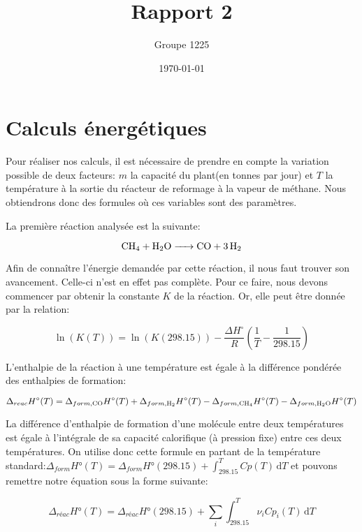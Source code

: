 \documentclass[a4paper, oneside, 12pt]{article}
\title{Rapport 2}
\author{Groupe 1225}
\date{\today}
\begin{document}
\maketitle

\section{Calculs énergétiques}

Pour réaliser nos calculs, il est nécessaire de prendre 
en compte la variation possible de 
deux facteurs: $m$ la capacité du plant(en tonnes par jour) 
et $T$ la température à la sortie du
réacteur de reformage à la vapeur de méthane.
Nous obtiendrons donc des formules où ces variables sont des paramètres.

La première réaction analysée est la suivante:

\begin{equation*}
	\ce{CH4 + H2O -> CO + 3H2}
\end{equation*}

Afin de connaître l'énergie demandée par cette réaction,
il nous faut trouver son avancement. Celle-ci n'est en effet pas complète.
Pour ce faire, nous devons commencer par obtenir la constante $K$ 
de la réaction. Or, elle peut être donnée par la relation:

\begin{equation}
	\ln{(K(T))} = \ln{(K(298.15))} - 
	\frac{\Delta H^{\circ}}{R}(\frac{1}{T} - \frac{1}{298.15})
\end{equation}

L'enthalpie de la réaction à une température est égale 
à la différence pondérée des enthalpies de formation:

\begin{equation}
	\Delta_{reac} H^{\circ} (T)= \Delta_{form,\ce{CO}} H^{\circ}(T)
	+\Delta_{form, \ce{H2}} H^{\circ} (T) - \Delta_{form, \ce{CH4}} H^{\circ} (T) 
	-\Delta_{form, \ce{H2O}} H^{\circ} (T)
\end{equation}

La différence d'enthalpie de formation d'une molécule entre deux températures est
égale à l'intégrale de sa capacité calorifique (à pression fixe) entre ces deux températures.
On utilise donc cette formule en partant de la température standard:$\Delta_{form}H°(T)= \Delta_{form}H°(298.15)+\int_298.15^T Cp(T) \, \mathrm dT$ et pouvons remettre notre équation sous la forme suivante:

\begin{equation}
	\Delta_{réac}H°(T)=\Delta_{réac}H°(298.15)+\sum_i \int_{298.15}^T \nu_i Cp_i(T) \, \mathrm dT
\end{equation}
\end{document}
